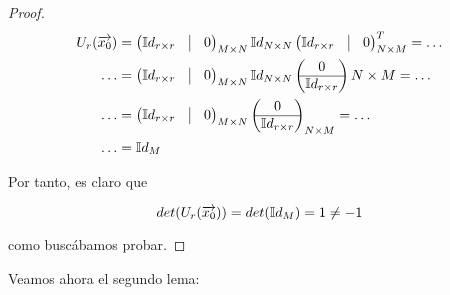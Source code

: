 \begin{proof}
    \begin{equation}
        \begin{split}
            U_r(\nv{x_0}) &= \begin{pmatrix}
                \mathbb{I}d_{r \times r} & \vline & 0 \\
            \end{pmatrix}_{M \times N}
            \mathbb{I}d_{N \times N}
            \begin{pmatrix}
                \mathbb{I}d_{r \times r} & \vline & 0 \\
            \end{pmatrix}^T_{N \times M} = \ldots \\
            \ldots &= \begin{pmatrix}
                \mathbb{I}d_{r \times r} & \vline & 0 \\
            \end{pmatrix}_{M \times N}
            \mathbb{I}d_{N \times N}
            \begin{pmatrix}
                0 \\
                \hline
                \mathbb{I}d_{r \times r}
            \end{pmatrix}{N \times M} = \ldots \\
            \ldots &= \begin{pmatrix}
                \mathbb{I}d_{r \times r} & \vline & 0 \\
            \end{pmatrix}_{M \times N}
            \begin{pmatrix}
                0 \\
                \hline
                \mathbb{I}d_{r \times r}
            \end{pmatrix}_{N \times M} = \ldots \\
            \ldots &= \mathbb{I}d_M
        \end{split}
    \end{equation}

    Por tanto, es claro que

    \begin{equation}
        det(U_r(\overrightarrow{x_0})) = det(\mathbb{I}d_M) = 1 \neq -1
    \end{equation}

    como buscábamos probar.
\end{proof}

Veamos ahora el segundo lema:

